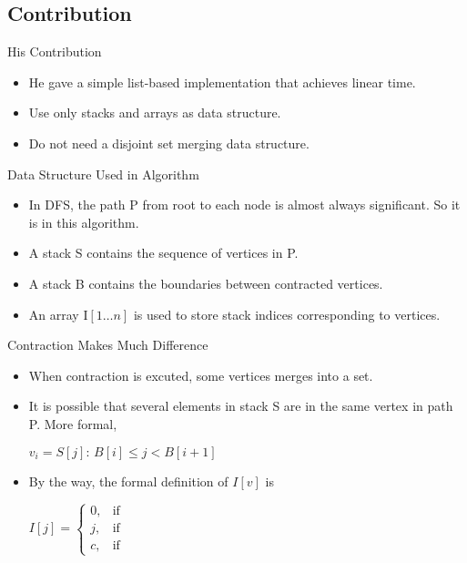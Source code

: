 \documentclass{beamer}
\begin{document}
\subsection{Contribution}

\begin{frame}{His Contribution}%

	\begin{itemize}
		\item
		He gave a simple list-based implementation that achieves linear time.
		\item
		Use only stacks and arrays as data structure. %
		\item
		Do not need a disjoint set merging data structure.
	\end{itemize}
\end{frame}

\begin{frame}{Data Structure Used in Algorithm}
	\begin{itemize}
		\item
		In DFS, the \alert{path P} from root to each node is almost always significant. So it is in this algorithm.
		\item
		A \alert{stack S} contains the sequence of vertices in P.
		\item
		A \alert{stack B} contains the boundaries between contracted vertices.
		\item
		An array I\alert{$[1\ldots n]$} is used to store stack indices corresponding to vertices.
	\end{itemize}
\end{frame}

\begin{frame}{Contraction Makes Much Difference}
	\begin{itemize}
		\item
		When contraction is excuted, some vertices merges into a set.
		\item
		It is possible that several elements in stack S are in the same vertex in path P.
		More formal, 
		\begin{center}
			$v_i={S[j]:\, B[i]\leq j< B[i+1]}$
		\end{center}
		\item
		By the way, the formal definition of $I[v]$ is
		\begin{center} %
			$I[j]=\begin{cases}
			0, & \text{if} \\
			j, & \text{if} \\
			c, & \text{if}
			\end{cases}$
		\end{center}
	\end{itemize}
\end{frame}
\end{document}
